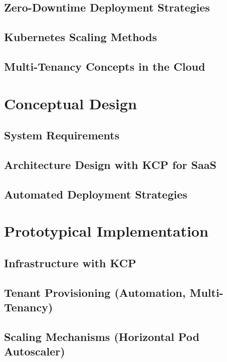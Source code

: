 \documentclass[11pt, a4paper, oneside]{scrartcl}
\begin{document}
        \subsection{Zero-Downtime Deployment Strategies}

        \subsection{Kubernetes Scaling Methods}

        \subsection{Multi-Tenancy Concepts in the Cloud}

    \section{Conceptual Design}

        \subsection{System Requirements}

        \subsection{Architecture Design with KCP for SaaS}

        \subsection{Automated Deployment Strategies}

    \section{Prototypical Implementation}

        \subsection{Infrastructure with KCP}

        \subsection{Tenant Provisioning (Automation, Multi-Tenancy)}

        \subsection{Scaling Mechanisms (Horizontal Pod Autoscaler)}
\end{document}
